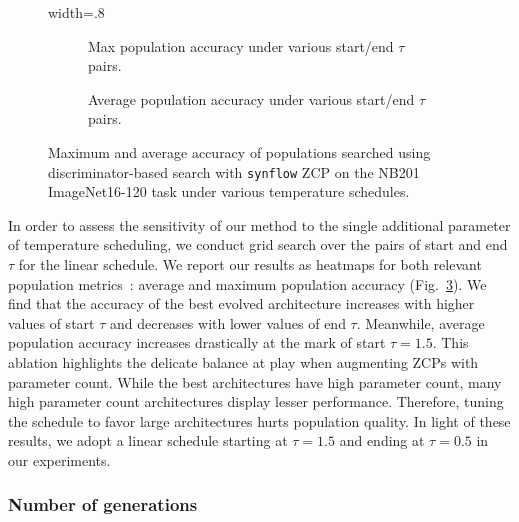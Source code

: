 \documentclass[10pt]{article} %
\begin{document}
\begin{figure}[h]
\centering
\begin{adjustbox}{width=.8\linewidth}
    \begin{subfigure}[t]{.4\textwidth}
        \resizebox{\textwidth}{!}{}
        \caption{\centering Max population accuracy under various start/end $\tau$ pairs.}
        \label{fig_abla_tau_max}
    \end{subfigure}%
    \hfill%
    \begin{subfigure}[t]{.4\textwidth}
        \resizebox{\textwidth}{!}{}
        \caption{\centering Average population accuracy under various start/end $\tau$ pairs.}
        \label{fig_abla_tau_avg}
    \end{subfigure}%
\end{adjustbox}
\caption{Maximum and average accuracy of populations searched using discriminator-based search with \texttt{synflow} ZCP on the NB201 ImageNet16-120 task under various temperature schedules.}
\label{fig_abla_tau}
\end{figure}

In order to assess the sensitivity of our method to the single additional parameter of temperature scheduling, we conduct grid search over the pairs of start and end $\tau$ for the linear schedule. We report our results as heatmaps for both relevant population metrics~: average and maximum population accuracy (Fig.~\ref{fig_abla_tau}). We find that the accuracy of the best evolved architecture increases with higher values of start $\tau$ and decreases with lower values of end $\tau$. Meanwhile, average population accuracy increases drastically at the mark of start $\tau=1.5$. This ablation highlights the delicate balance at play when augmenting ZCPs with parameter count. While the best architectures have high parameter count, many high parameter count architectures display lesser performance. Therefore, tuning the schedule to favor large architectures hurts population quality. In light of these results, we adopt a linear schedule starting at $\tau=1.5$ and ending at $\tau=0.5$ in our experiments.

\subsubsection{Number of generations}
\end{document}
